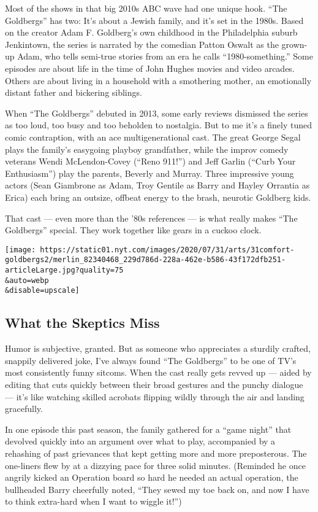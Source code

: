 Most of the shows in that big 2010s ABC wave had one unique hook. ``The
Goldbergs'' has two: It's about a Jewish family, and it's set in the
1980s. Based on the creator Adam F. Goldberg's own childhood in the
Philadelphia suburb Jenkintown, the series is narrated by the comedian
Patton Oswalt as the grown-up Adam, who tells semi-true stories from an
era he calls ``1980-something.'' Some episodes are about life in the
time of John Hughes movies and video arcades. Others are about living in
a household with a smothering mother, an emotionally distant father and
bickering siblings.

When ``The Goldbergs'' debuted in 2013, some early reviews dismissed the
series as too loud, too busy and too beholden to nostalgia. But to me
it's a finely tuned comic contraption, with an ace multigenerational
cast. The great George Segal plays the family's easygoing playboy
grandfather, while the improv comedy veterans Wendi McLendon-Covey
(``Reno 911!'') and Jeff Garlin (``Curb Your Enthusiasm'') play the
parents, Beverly and Murray. Three impressive young actors (Sean
Giambrone as Adam, Troy Gentile as Barry and Hayley Orrantia as Erica)
each bring an outsize, offbeat energy to the brash, neurotic Goldberg
kids.

That cast --- even more than the '80s references --- is what really
makes ``The Goldbergs'' special. They work together like gears in a
cuckoo clock.

\texttt{[image: https://static01.nyt.com/images/2020/07/31/arts/31comfort-goldbergs2/merlin\_82340468\_229d786d-228a-462e-b586-43f172dfb251-articleLarge.jpg?quality=75\\\&auto=webp\\\&disable=upscale]}

\hypertarget{what-the-skeptics-miss}{%
\subsection{What the Skeptics Miss}\label{what-the-skeptics-miss}}

Humor is subjective, granted. But as someone who appreciates a sturdily
crafted, snappily delivered joke, I've always found ``The Goldbergs'' to
be one of TV's most consistently funny sitcoms. When the cast really
gets revved up --- aided by editing that cuts quickly between their
broad gestures and the punchy dialogue --- it's like watching skilled
acrobats flipping wildly through the air and landing gracefully.

In one episode this past season, the family gathered for a ``game
night'' that devolved quickly into an argument over what to play,
accompanied by a rehashing of past grievances that kept getting more and
more preposterous. The one-liners flew by at a dizzying pace for three
solid minutes. (Reminded he once angrily kicked an Operation board so
hard he needed an actual operation, the bullheaded Barry cheerfully
noted, ``They sewed my toe back on, and now I have to think extra-hard
when I want to wiggle it!'')

